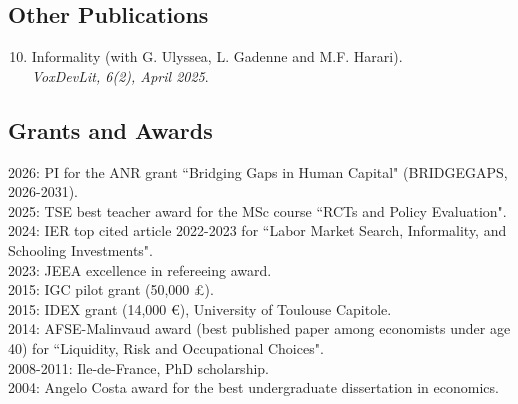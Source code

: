 \documentclass[12pt,english]{article}
\begin{document}
\subsection*{Other Publications}
\begin{enumerate}
\setcounter{enumi}{9}
\item Informality (with G. Ulyssea, L. Gadenne and M.F. Harari). \\
\textit{VoxDevLit, 6(2), April 2025}.
\end{enumerate}



\subsection*{Grants and Awards}
2026: PI for the ANR grant ``Bridging Gaps in Human Capital" (BRIDGEGAPS, 2026-2031).\vspace{0.2cm} \\
2025: TSE best teacher award for the MSc course ``RCTs and Policy Evaluation".\vspace{0.2cm} \\
2024: IER top cited article 2022-2023 for ``Labor Market Search, Informality, and Schooling Investments".\vspace{0.2cm} \\
2023: JEEA excellence in refereeing award.\vspace{0.2cm} \\
2015: IGC pilot grant (50,000 \pounds). \vspace{0.2cm} \\
2015: IDEX grant (14,000 \euro), University of Toulouse Capitole. \vspace{0.2cm} \\
2014: AFSE-Malinvaud award (best published paper among economists under age 40) for ``Liquidity, Risk and Occupational Choices". \vspace{0.2cm}\\
2008-2011: Ile-de-France, PhD scholarship. \vspace{0.2cm}\\
2004: Angelo Costa award for the best undergraduate dissertation in economics. 
\end{document}
